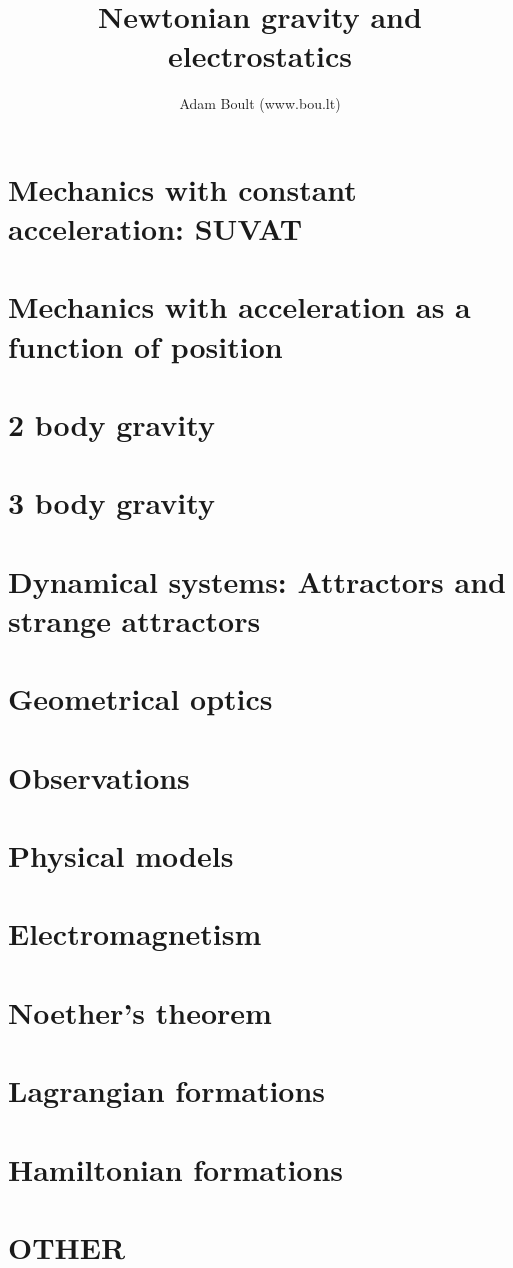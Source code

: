 \documentclass[oneside]{book}
\begin{document}
\author{Adam Boult (www.bou.lt)}
\title{Newtonian gravity and electrostatics}
\maketitle

\setcounter{tocdepth}{0}
\tableofcontents



\part{Mechanics with constant acceleration: SUVAT}


\part{Mechanics with acceleration as a function of position}



\part{2 body gravity}


\part{3 body gravity}

\part{Dynamical systems: Attractors and strange attractors}

\part{Geometrical optics}

\part{Observations}

\part{Physical models}





\part{Electromagnetism}


\part{Noether's theorem}


\part{Lagrangian formations}


\part{Hamiltonian formations}


\part{OTHER}

\end{document}
